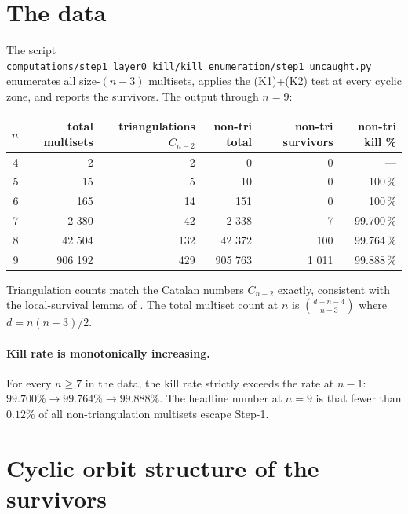 \documentclass[11pt]{article}
\theoremstyle{definition}
\begin{document}
\section{The data}

The script \verb|computations/step1_layer0_kill/kill_enumeration/step1_uncaught.py|
enumerates all size-$(n-3)$ multisets, applies the (K1)+(K2) test at
every cyclic zone, and reports the survivors. The output through
$n = 9$:

\begin{center}
\begin{tabular}{rrrrrr}
\toprule
$n$ & total multisets & triangulations $C_{n-2}$
       & non-tri total & non-tri survivors & non-tri kill \% \\
\midrule
4 &       2 &     2 &       0 &     0 & --- \\
5 &      15 &     5 &      10 &     0 & 100\,\% \\
6 &     165 &    14 &     151 &     0 & 100\,\% \\
7 &   2 380 &    42 &   2 338 &     7 & 99.700\,\% \\
8 &  42 504 &   132 &  42 372 &   100 & 99.764\,\% \\
9 & 906 192 &   429 & 905 763 & 1 011 & 99.888\,\% \\
\bottomrule
\end{tabular}
\end{center}

Triangulation counts match the Catalan numbers $C_{n-2}$ exactly,
consistent with the local-survival lemma of \cite{tri-survives}. The
total multiset count at $n$ is
$\binom{d+n-4}{n-3}$ where $d = n(n-3)/2$.

\paragraph{Kill rate is monotonically increasing.} For every $n \ge 7$
in the data, the kill rate strictly exceeds the rate at $n - 1$:
$99.700\% \to 99.764\% \to 99.888\%$. The headline number at $n = 9$
is that fewer than $0.12\%$ of all non-triangulation multisets escape
Step-1.

\section{Cyclic orbit structure of the survivors}
\end{document}
